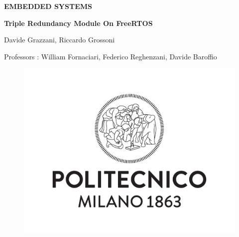 \documentclass[a4paper, 12pt]{article}
\begin{document}
\noindent


\begin{titlepage}

\begin{center}
\hspace{100cm}

\vspace{1cm}

\LARGE{\textbf{EMBEDDED SYSTEMS}}

\vspace{1cm}

\huge{\textbf{ Triple Redundancy Module On FreeRTOS}}

\vspace{1cm}

\LARGE{Davide Grazzani, Riccardo Grossoni }

\vspace{1cm}

\LARGE{Professors : William Fornaciari, Federico Reghenzani, Davide Baroffio}

\vspace{0,5cm}


\begin{figure}[h]
\begin{center}
\includegraphics[scale=1]{Logo_Politecnico_Milano.svg_.png}
\end{center}
\end{figure}

\vspace{1cm}



\end{center}

\end{titlepage}
\end{document}
